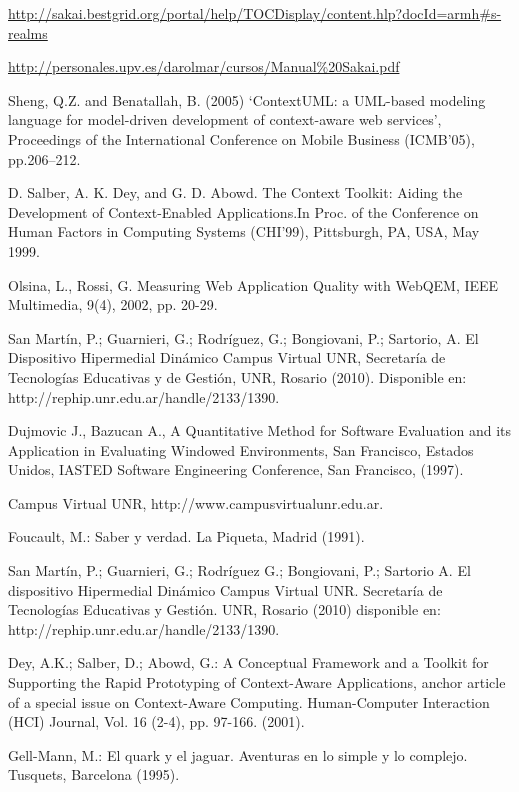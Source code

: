 \begin{thebibliography}{1}
{
\url{
http://sakai.bestgrid.org/portal/help/TOCDisplay/content.hlp?docId=armh#s-realms
}


\url{
http://personales.upv.es/darolmar/cursos/Manual\%20Sakai.pdf
}



Sheng, Q.Z. and Benatallah, B. (2005) ‘ContextUML: a UML-based modeling
language for model-driven development of context-aware web services’,
Proceedings of the International Conference on Mobile Business (ICMB’05),
pp.206–212.

D. Salber, A. K. Dey, and G. D. Abowd. The Context Toolkit: Aiding the
Development of Context-Enabled Applications.In Proc. of the Conference on Human
Factors in Computing Systems (CHI’99), Pittsburgh, PA, USA, May 1999.


Olsina, L., Rossi, G. Measuring Web Application Quality with WebQEM, IEEE
Multimedia, 9(4), 2002, pp. 20-29.


San Martín, P.; Guarnieri, G.; Rodríguez, G.; Bongiovani, P.; Sartorio, A. El
Dispositivo Hipermedial Dinámico Campus Virtual UNR, Secretaría de Tecnologías
Educativas y de Gestión, UNR, Rosario (2010). Disponible en:
http://rephip.unr.edu.ar/handle/2133/1390.

Dujmovic J., Bazucan A., A Quantitative Method for Software Evaluation and its
Application in Evaluating Windowed Environments, San Francisco, Estados Unidos,
IASTED Software Engineering Conference, San Francisco, (1997).


Campus Virtual UNR, http://www.campusvirtualunr.edu.ar.

\bibitem{}
Foucault, M.: Saber y verdad. La Piqueta, Madrid (1991).

\bibitem{}
San Martín, P.; Guarnieri, G.; Rodríguez G.; Bongiovani, P.; Sartorio A. El
dispositivo Hipermedial Dinámico Campus Virtual UNR. Secretaría de Tecnologías
Educativas y Gestión. UNR, Rosario (2010) disponible
en: http://rephip.unr.edu.ar/handle/2133/1390.

\bibitem{}
Dey, A.K.; Salber, D.; Abowd, G.: A Conceptual Framework and a Toolkit for
Supporting the Rapid Prototyping of Context-Aware Applications, anchor article
of a special issue on Context-Aware Computing. Human-Computer Interaction (HCI)
Journal, Vol. 16 (2-4), pp. 97-166. (2001).


\bibitem{}
Gell-Mann, M.: El quark y el jaguar. Aventuras en lo simple y lo complejo.
Tusquets, Barcelona (1995).


}
\end{thebibliography}
